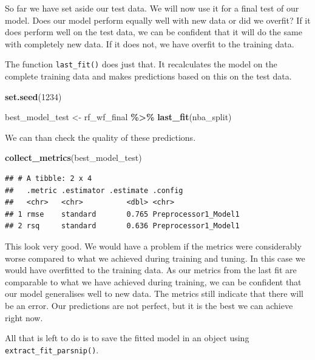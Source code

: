\documentclass[
]{book}
\newenvironment{Shaded}{\begin{snugshade}}{\end{snugshade}}
\newcommand{\DecValTok}[1]{\textcolor[rgb]{0.00,0.00,0.81}{#1}}
\newcommand{\FunctionTok}[1]{\textcolor[rgb]{0.13,0.29,0.53}{\textbf{#1}}}
\newcommand{\NormalTok}[1]{#1}
\newcommand{\OtherTok}[1]{\textcolor[rgb]{0.56,0.35,0.01}{#1}}
\newcommand{\SpecialCharTok}[1]{\textcolor[rgb]{0.81,0.36,0.00}{\textbf{#1}}}
\begin{document}
So far we have set aside our test data. We will now use it for a final test of
our model. Does our model perform equally well with new data or did we overfit?
If it does perform well on the test data, we can be confident that it will do
the same with completely new data. If it does not, we have overfit to the
training data.

The function \texttt{last\_fit()} does just that. It recalculates the model on the
complete training data and makes predictions based on this on the test data.

\begin{Shaded}
\begin{Highlighting}[]
\FunctionTok{set.seed}\NormalTok{(}\DecValTok{1234}\NormalTok{)}

\NormalTok{best\_model\_test }\OtherTok{\textless{}{-}}\NormalTok{ rf\_wf\_final }\SpecialCharTok{\%\textgreater{}\%} 
  \FunctionTok{last\_fit}\NormalTok{(nba\_split)}
\end{Highlighting}
\end{Shaded}

We can than check the quality of these predictions.

\begin{Shaded}
\begin{Highlighting}[]
\FunctionTok{collect\_metrics}\NormalTok{(best\_model\_test)}
\end{Highlighting}
\end{Shaded}

\begin{verbatim}
## # A tibble: 2 x 4
##   .metric .estimator .estimate .config             
##   <chr>   <chr>          <dbl> <chr>               
## 1 rmse    standard       0.765 Preprocessor1_Model1
## 2 rsq     standard       0.636 Preprocessor1_Model1
\end{verbatim}

This look very good. We would have a problem if the metrics were considerably
worse compared to what we achieved during training and tuning. In this case we
would have overfitted to the training data. As our metrics from the last fit are
comparable to what we have achieved during training, we can be confident that
our model generalises well to new data. The metrics still indicate that there
will be an error. Our predictions are not perfect, but it is the best we can
achieve right now.

All that is left to do is to save the fitted model in an object using
\texttt{extract\_fit\_parsnip()}.
\end{document}
